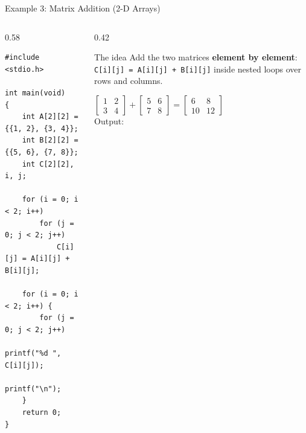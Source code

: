 \documentclass[aspectratio=169]{beamer}
\begin{document}
	\begin{frame}[fragile]{Example 3: Matrix Addition (2-D Arrays)}
		\begin{columns}[T]
			\begin{column}{0.58\textwidth}
				\begin{lstlisting}
#include <stdio.h>

int main(void)
{
    int A[2][2] = {{1, 2}, {3, 4}};
    int B[2][2] = {{5, 6}, {7, 8}};
    int C[2][2], i, j;

    for (i = 0; i < 2; i++)
        for (j = 0; j < 2; j++)
            C[i][j] = A[i][j] + B[i][j];

    for (i = 0; i < 2; i++) {
        for (j = 0; j < 2; j++)
            printf("%d ", C[i][j]);
        printf("\n");
    }
    return 0;
}
				\end{lstlisting}
			\end{column}
			\begin{column}{0.42\textwidth}
				\begin{block}{The idea}
					\small Add the two matrices \textbf{element by element}: \texttt{C[i][j] = A[i][j] + B[i][j]}
					inside nested loops over rows and columns.
				\end{block}
				\centering\footnotesize
				$\begin{bmatrix} 1 & 2 \\ 3 & 4 \end{bmatrix} +
				 \begin{bmatrix} 5 & 6 \\ 7 & 8 \end{bmatrix} =
				 \begin{bmatrix} 6 & 8 \\ 10 & 12 \end{bmatrix}$
				\\[6pt]
				Output:\; 
			\end{column}
		\end{columns}
	\end{frame}
\end{document}
